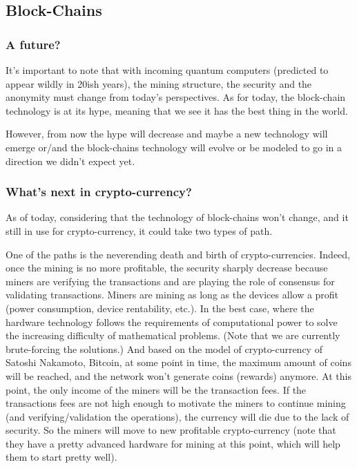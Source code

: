 
\subsection{Block-Chains}
\subsubsection{A future?}
It's important to note that with incoming quantum computers (predicted to appear wildly in 20ish years), the mining structure, the security and the anonymity must change from today's perspectives. 
As for today, the block-chain technology is at its hype, meaning that we see it has the best thing in the world.

However, from now the hype will decrease and maybe a new technology will emerge or/and the block-chains technology will evolve or be modeled to go in a direction we didn't expect yet.

\subsubsection{What's next in crypto-currency?}

As of today, considering that the technology of block-chains won't change, and it still in use for crypto-currency, it could take two types of path.

One of the paths is the neverending death and birth of crypto-currencies. Indeed, once the mining is no more profitable, the security sharply decrease because miners are verifying the transactions and are playing the role of consensus for validating transactions. Miners are mining as long as the devices allow a profit (power consumption, device rentability, etc.). In the best case, where the hardware technology follows the requirements of computational power to solve the increasing difficulty of mathematical problems. (Note that we are currently brute-forcing the solutions.) And based on the model of crypto-currency of Satoshi Nakamoto, Bitcoin, at some point in time, the maximum amount of coins will be reached, and the network won't generate coins (rewards) anymore. At this point, the only income of the miners will be the transaction fees. If the transactions fees are not high enough to motivate the miners to continue mining (and verifying/validation the operations), the currency will die due to the lack of security. So the miners will move to new profitable crypto-currency (note that they have a pretty advanced hardware for mining at this point, which will help them to start pretty well).

